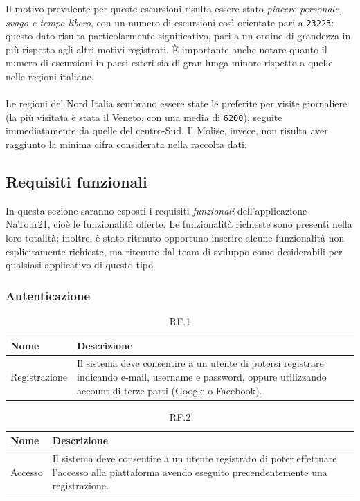 \documentclass{natourDoc}
\begin{document}
Il motivo prevalente per queste escursioni risulta essere stato \textit{piacere personale, svago e tempo libero}, con un numero
di escursioni così orientate pari a \texttt{23223}: questo dato risulta particolarmente significativo, pari a un ordine
di grandezza in più rispetto agli altri motivi registrati. È importante anche notare quanto il numero di escursioni in paesi
esteri sia di gran lunga minore rispetto a quelle nelle regioni italiane.\\\\
Le regioni del Nord Italia sembrano essere state le preferite per visite giornaliere (la più visitata è stata il Veneto, con una media di
\texttt{6200}), seguite immediatamente da quelle del centro-Sud. Il Molise, invece, non risulta aver raggiunto
la minima cifra considerata nella raccolta dati.\\

\subsection{Requisiti funzionali}
In questa sezione saranno esposti i requisiti \textit{funzionali} dell'applicazione NaTour21, cioè le funzionalità offerte.
Le funzionalità richieste sono presenti nella loro totalità; inoltre, è stato ritenuto opportuno inserire alcune funzionalità non
esplicitamente richieste, ma ritenute dal team di sviluppo come desiderabili per qualsiasi applicativo di questo tipo.

\subsubsection{Autenticazione}
\begin{table}[H]
	\centering
	\begin{tabular}{ |p{5cm}|p{10.3cm}| }
		\hline
		\rowcolor{PineGreen!70}
		\textbf{Nome} & \textbf{Descrizione}                                                                                                                                               \\
		\hline
		Registrazione & Il sistema deve consentire a un utente di potersi registrare indicando e-mail, username e password, oppure utilizzando account di terze parti (Google o Facebook). \\
		\hline
	\end{tabular}
	\caption{RF.1}
\end{table}

\begin{table}[H]
	\centering
	\begin{tabular}{ |p{5cm}|p{10.3cm}| }
		\hline
		\rowcolor{PineGreen!70}
		\textbf{Nome} & \textbf{Descrizione}                                                                                                                                 \\
		\hline
		Accesso       & Il sistema deve consentire a un utente registrato di poter effettuare l'accesso alla piattaforma avendo eseguito precendentemente una registrazione. \\
		\hline
	\end{tabular}
	\caption{RF.2}

\end{table}
\end{document}
